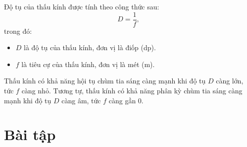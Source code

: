 Độ tụ của thấu kính được tính theo công thức sau:
\begin{equation}
D=\dfrac{1}{f},
\end{equation}
trong đó:
\begin{itemize}
	\item $D$ là độ tụ của thấu kính, đơn vị là điốp (dp). 
	\item $f$ là tiêu cự của thấu kính, đơn vị là mét (m).
\end{itemize}
Thấu kính có khả năng hội tụ chùm tia sáng càng mạnh khi độ tụ $D$ càng lớn, tức $f$ càng nhỏ. Tương tự, thấu kính có khả năng phân kỳ chùm tia sáng càng mạnh khi độ tụ $D$ càng âm, tức $f$ càng gần 0.
\section{Bài tập }

